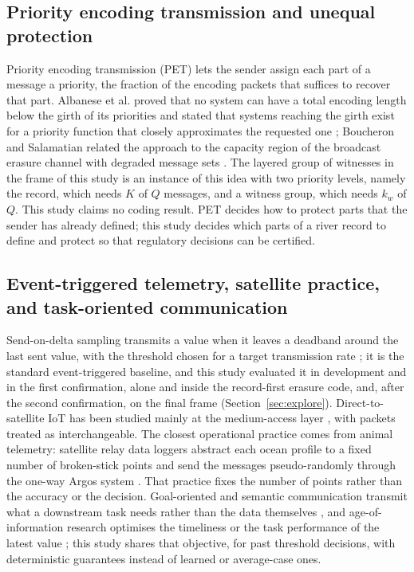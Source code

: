 \subsection{Priority encoding transmission and unequal protection}
Priority encoding transmission (PET) lets the sender assign each part of a message a priority, the fraction of the encoding packets that suffices to recover that part. Albanese et al. proved that no system can have a total encoding length below the girth of its priorities and stated that systems reaching the girth exist for a priority function that closely approximates the requested one \citep{albanese1996}; Boucheron and Salamatian related the approach to the capacity region of the broadcast erasure channel with degraded message sets \citep{boucheron2000pet}. The layered group of witnesses in the frame of this study is an instance of this idea with two priority levels, namely the record, which needs $K$ of $Q$ messages, and a witness group, which needs $k_w$ of $Q$. This study claims no coding result. PET decides how to protect parts that the sender has already defined; this study decides which parts of a river record to define and protect so that regulatory decisions can be certified.

\subsection{Event-triggered telemetry, satellite practice, and task-oriented communication}
Send-on-delta sampling transmits a value when it leaves a deadband around the last sent value, with the threshold chosen for a target transmission rate \citep{diazcacho2017sod}; it is the standard event-triggered baseline, and this study evaluated it in development and in the first confirmation, alone and inside the record-first erasure code, and, after the second confirmation, on the final frame (Section~\ref{sec:explore}). Direct-to-satellite IoT has been studied mainly at the medium-access layer \citep{capez2022,tondo2021,alvarez2022,afhamisis2022,rathi2025}, with packets treated as interchangeable. The closest operational practice comes from animal telemetry: satellite relay data loggers abstract each ocean profile to a fixed number of broken-stick points and send the messages pseudo-randomly through the one-way Argos system \citep{boehme2009,photopoulou2015}. That practice fixes the number of points rather than the accuracy or the decision. Goal-oriented and semantic communication transmit what a downstream task needs rather than the data themselves \citep{zhang2023semantic}, and age-of-information research optimises the timeliness or the task performance of the latest value \citep{yates2021,chen2021,talli2026}; this study shares that objective, for past threshold decisions, with deterministic guarantees instead of learned or average-case ones.

